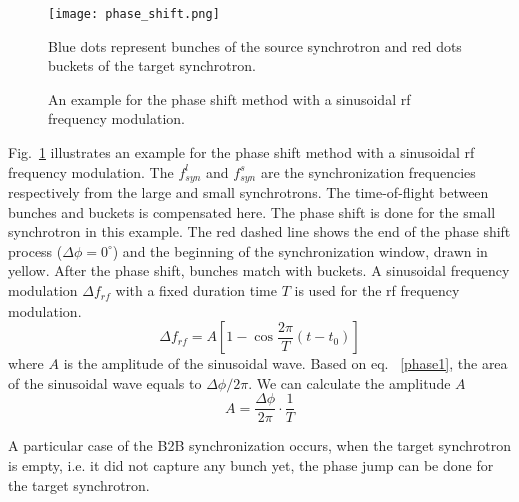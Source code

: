 \begin{figure}[!htb]
   \centering   
   \texttt{[image: phase\_shift.png]}
   \caption{An example for the phase shift method with a sinusoidal rf frequency modulation.}{Blue dots represent bunches of the source synchrotron and red dots buckets of the target synchrotron.}
   \label{phase_shift}
\end{figure}


Fig.~\ref{phase_shift} illustrates an example for the phase shift method with a sinusoidal rf frequency modulation. The $f_{\mathit{syn}}^{l}$ and $f_{\mathit{syn}}^{s}$ are the synchronization frequencies respectively from the large and small synchrotrons. The time-of-flight between bunches and buckets is compensated here. The phase shift is done for the small synchrotron in this example. The red dashed line shows the end of the phase shift process ($\Delta \phi=0^\circ$) and the beginning of the synchronization window, drawn in yellow. After the phase shift, bunches match with buckets. A sinusoidal frequency modulation $\Delta f_{\mathit{rf}}$ with a fixed duration time $T$ is used for the rf frequency modulation.
\begin{equation}
\Delta f_{\mathit{rf}}=A[1-\cos \frac{2\pi}{T}(t-t_0)]
\end{equation}
where $A$ is the amplitude of the sinusoidal wave. Based on eq. ~\ref{phase1}, the area of the sinusoidal wave equals to $\Delta \phi/2\pi$. We can calculate the amplitude $A$  
\begin{equation}
A= \frac{\Delta \phi}{2\pi}\cdot\frac{1}{T}
\end{equation}

A particular case of the B2B synchronization occurs, when the target synchrotron is empty, i.e. it did not capture any bunch yet, the phase jump can be done for the target synchrotron.


